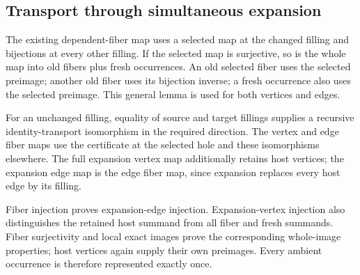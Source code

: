 
\subsection{Transport through simultaneous expansion}

The existing dependent-fiber map uses a selected map at the changed filling
and bijections at every other filling. If the selected map is surjective,
so is the whole map into old fibers plus fresh occurrences. An old selected
fiber uses the selected preimage; another old fiber uses its bijection inverse;
a fresh occurrence also uses the selected preimage. This general lemma is
used for both vertices and edges.


For an unchanged filling, equality of source and target fillings supplies
a recursive identity-transport isomorphism in the required direction.
The vertex and edge fiber maps use the certificate at the selected hole and
these isomorphisms elsewhere. The full expansion vertex map additionally
retains host vertices; the expansion edge map is the edge fiber map, since
expansion replaces every host edge by its filling.






Fiber injection proves expansion-edge injection. Expansion-vertex injection
also distinguishes the retained host summand from all fiber and fresh summands.
Fiber surjectivity and local exact images prove the corresponding whole-image
properties; host vertices again supply their own preimages. Every ambient
occurrence is therefore represented exactly once.


